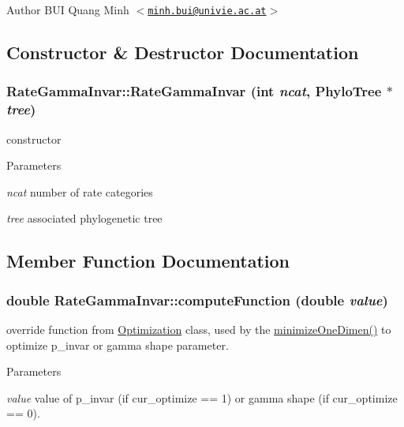 \begin{DoxyAuthor}{Author}
BUI Quang Minh $<$\href{mailto:minh.bui@univie.ac.at}{\tt minh.bui@univie.ac.at}$>$ 
\end{DoxyAuthor}


\subsection{Constructor \& Destructor Documentation}
\hypertarget{classRateGammaInvar_ada238d8306a13a7a9ad57fcb88349e48}{
\subsubsection[{RateGammaInvar}]{\setlength{\rightskip}{0pt plus 5cm}RateGammaInvar::RateGammaInvar (int {\em ncat}, \/  {\bf PhyloTree} $\ast$ {\em tree})}}
\label{classRateGammaInvar_ada238d8306a13a7a9ad57fcb88349e48}
constructor 
\begin{DoxyParams}{Parameters}
\item[{\em ncat}]number of rate categories \item[{\em tree}]associated phylogenetic tree \end{DoxyParams}


\subsection{Member Function Documentation}
\hypertarget{classRateGammaInvar_a48fde92a023867c5d0656572f8dc0f71}{
\subsubsection[{computeFunction}]{\setlength{\rightskip}{0pt plus 5cm}double RateGammaInvar::computeFunction (double {\em value})}}
\label{classRateGammaInvar_a48fde92a023867c5d0656572f8dc0f71}
override function from \hyperlink{classOptimization}{Optimization} class, used by the \hyperlink{classOptimization_a59ccdfae81744716ce48226da029d470}{minimizeOneDimen()} to optimize p\_\-invar or gamma shape parameter. 
\begin{DoxyParams}{Parameters}
\item[{\em value}]value of p\_\-invar (if cur\_\-optimize == 1) or gamma shape (if cur\_\-optimize == 0). \end{DoxyParams}


